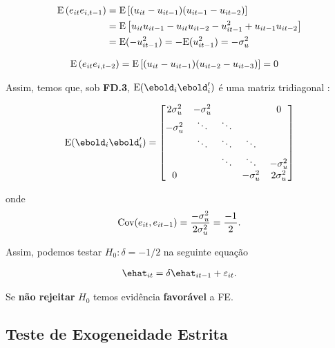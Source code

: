 \documentclass[11pt, oneside, a4paper, article]{article}
\numberwithin{equation}{section}
\begin{document}
\begin{description}
\vspace{-1.5 em}
\begin{align*}
\text{E}\left( e_{it} e_{i,t-1} \right) &=
\text{E}\left[ (u_{it} - u_{it-1}) (u_{it-1} - u_{it-2}) \right]
\\ &=
\text{E}\left[ u_{it}u_{it-1} - u_{it}u_{it-2} - u_{it-1}^{2} + u_{it-1}u_{it-2} \right]
\\ &=
\text{E}(- u_{it-1}^2) = - \text{E}(u_{it-1}^2) = - \sigma_{u}^2
\end{align*}

\vspace{-1.5 em}
\begin{align*}
\text{E}\left( e_{it} e_{i,t-2} \right) &=
\text{E}\left[ (u_{it} - u_{it-1}) (u_{it-2} - u_{it-3}) \right]
= 0
\end{align*}

Assim, temos que, sob \textbf{FD.3},
$\E(\ebold_{i} \ebold_{i}')$
é uma matriz tridiagonal :

\vspace{-1 em}
\begin{align*}
\E(\ebold_{i} \ebold_{i}') =
\begin{bmatrix}
2 \sigma_{u}^{2} & - \sigma_{u}^{2} & & & 0
\\
- \sigma_{u}^{2} & \ddots & \ddots
\\
 & \ddots & \ddots & \ddots
\\
& & \ddots & \ddots & - \sigma_{u}^{2}
\\
0 & & & - \sigma_{u}^{2} & 2 \sigma_{u}^{2}
\end{bmatrix}
\end{align*}

\noindent
onde
\begin{align*}
	\text{Cov}(e_{it}, e_{it-1}) = \frac{-\sigma_{u}^{2}}{2 \sigma_{u}^{2}} = \frac{-1}{2}.
\end{align*}

\noindent
Assim, podemos testar $H_{0}: \delta = -1/2$ na seguinte equação

\vspace{-1 em}
\begin{align*}
	\ehat_{it} = \delta \ehat_{it-1} + \err_{it}.
\end{align*}

\noindent
Se \textbf{não rejeitar} $H_{0}$ temos evidência \textbf{favorável} a FE.
\subsection{Teste de Exogeneidade Estrita}


\end{description}
\end{document}
